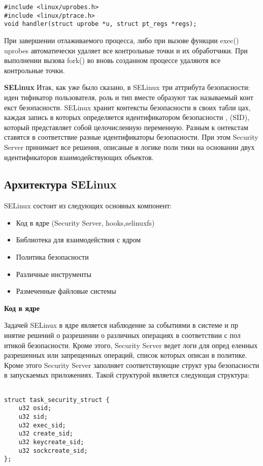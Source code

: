 \begin{lstlisting}
#include <linux/uprobes.h>
#include <linux/ptrace.h>
void handler(struct uprobe *u, struct pt_regs *regs);
\end{lstlisting}

\bigskip
При завершении отлаживаемого процесса, либо при вызове функции exec() 
uprobes автоматически удаляет все контрольные точки и их обработчики. 
При выполнении вызова fork() во вновь созданном процессе удаляютя все 
контрольные точки. 


\bigskip 
{\bfseries SELinux}
Итак, как уже было сказано, в SELinux три аттрибута безопасности: иден
тификатор пользователя, роль и тип вместе образуют так называемый конт
екст безопасности. SELinux хранит контексты безопасности в своих табли
цах, каждая запись в которых определяется идентификатором безопасности
, (SID), который представляет собой целочисленную переменную. Разным к
онтекстам ставятся в соответствие разные идентификаторы безопасности. 
При этом Security Server принимает все решения, описаные в логике поли
тики на основании двух идентификаторов взаимодействующих объектов. 

\bigskip
\subsection{Архитектура SELinux}
SELinux состоит из следующих основных компонент:
\begin{itemize}
\item Код в ядре (Security Server, hooks,selinuxfs)
\item Библиотека для взаимодействия с ядром
\item Политика безопасности
\item Различные инструменты
\item Размеченные файловые системы
\end{itemize}

\bigskip
{\bfseries Код в ядре}

Задачей SELinux в ядре является наблюдение за событиями в системе и пр
инятие решений о разрешении о различных операциях в соответствии с пол
итикой безопасности. Кроме этого, Security Server ведет логи для опред
еленных разрешенных или запрещенных операций, список которых описан в 
политике. Кроме этого Security Server заполняет соответствующие структ
уры безопасности в запускаемых приложениях. Такой структурой является 
следующая структура: 

\bigskip 
\begin{lstlisting}
	
struct task_security_struct {
	u32 osid;		
	u32 sid;	
	u32 exec_sid;		
	u32 create_sid;		
	u32 keycreate_sid;	
	u32 sockcreate_sid;	
};

\end{lstlisting}

